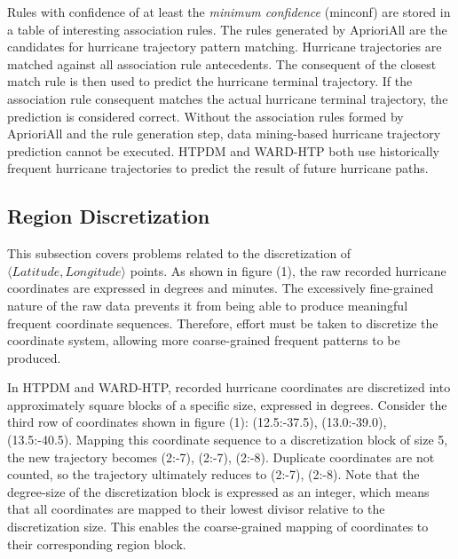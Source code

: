 \documentclass[12pt,conference]{IEEEtran}
\begin{document}
Rules with confidence of at least the \textit{minimum confidence} (minconf) are stored in a table of interesting association rules. The rules generated by AprioriAll are the candidates for hurricane trajectory pattern matching. Hurricane trajectories are matched against all association rule antecedents. The consequent of the closest match rule is then used to predict the hurricane terminal trajectory. If the association rule consequent matches the actual hurricane terminal trajectory, the prediction is considered correct. Without the association rules formed by AprioriAll and the rule generation step, data mining-based hurricane trajectory prediction cannot be executed. HTPDM and WARD-HTP both use historically frequent hurricane trajectories to predict the result of future hurricane paths.

\subsection{Region Discretization}

This subsection covers problems related to the discretization of $\langle Latitude, Longitude \rangle$ points. As shown in figure (1), the raw recorded hurricane coordinates are expressed in degrees and minutes. The excessively fine-grained nature of the raw data prevents it from being able to produce meaningful frequent coordinate sequences. Therefore, effort must be taken to discretize the coordinate system, allowing more coarse-grained frequent patterns to be produced.

In HTPDM and WARD-HTP, recorded hurricane coordinates are discretized into approximately square blocks of a specific size, expressed in degrees. Consider the third row of coordinates shown in figure (1): (12.5:-37.5), (13.0:-39.0), (13.5:-40.5). Mapping this coordinate sequence to a discretization block of size 5, the new trajectory becomes (2:-7), (2:-7), (2:-8). Duplicate coordinates are not counted, so the trajectory ultimately reduces to (2:-7), (2:-8). Note that the degree-size of the discretization block is expressed as an integer, which means that all coordinates are mapped to their lowest divisor relative to the discretization size. This enables the coarse-grained mapping of coordinates to their corresponding region block. 
\end{document}
